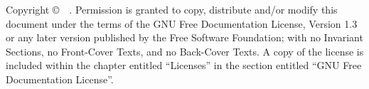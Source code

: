 \documentclass[11pt,onecolumn,letterpaper]{report}%
\begin{document}
\pagestyle{empty}

\author{\thisauthor}
\maketitle



\ifMKhtml
	\clearpage
\else
	\cleardoublepage
\fi
{\parindent 0in
 Copyright \copyright\ \doccpyyear\ \thisauthor.
 Permission is granted to copy, distribute and/or modify this document
 under the terms of the GNU Free Documentation License, Version 1.3
 or any later version published by the Free Software Foundation;
 with no Invariant Sections, no Front-Cover Texts, and no Back-Cover Texts.
 A copy of the license is included within the chapter
 entitled ``Licenses''
 in the section entitled ``GNU Free Documentation License''.}
\ifMKhtml
	\clearpage
\else
	\cleardoublepage
\fi

\pagestyle{plain}

\tableofcontents
\label{chap:tab_of_contents}
\end{document}
